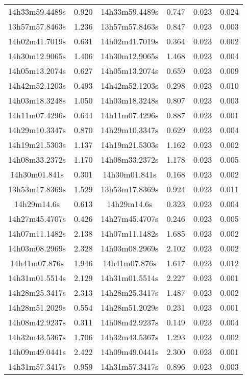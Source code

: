 \begin{table}
\begin{tabular}{cccccc}
14h33m59.4489s & 0.920 & 14h33m59.4489s & 0.747 & 0.023 & 0.024 \\
13h57m57.8463s & 1.236 & 13h57m57.8463s & 0.847 & 0.023 & 0.003 \\
14h02m41.7019s & 0.631 & 14h02m41.7019s & 0.364 & 0.023 & 0.002 \\
14h30m12.9065s & 1.406 & 14h30m12.9065s & 1.468 & 0.023 & 0.004 \\
14h05m13.2074s & 0.627 & 14h05m13.2074s & 0.659 & 0.023 & 0.009 \\
14h42m52.1203s & 0.493 & 14h42m52.1203s & 0.298 & 0.023 & 0.010 \\
14h03m18.3248s & 1.050 & 14h03m18.3248s & 0.807 & 0.023 & 0.003 \\
14h11m07.4296s & 0.644 & 14h11m07.4296s & 0.887 & 0.023 & 0.001 \\
14h29m10.3347s & 0.870 & 14h29m10.3347s & 0.629 & 0.023 & 0.004 \\
14h19m21.5303s & 1.137 & 14h19m21.5303s & 1.162 & 0.023 & 0.002 \\
14h08m33.2372s & 1.170 & 14h08m33.2372s & 1.178 & 0.023 & 0.005 \\
14h30m01.841s & 0.301 & 14h30m01.841s & 0.168 & 0.023 & 0.002 \\
13h53m17.8369s & 1.529 & 13h53m17.8369s & 0.924 & 0.023 & 0.011 \\
14h29m14.6s & 0.613 & 14h29m14.6s & 0.323 & 0.023 & 0.004 \\
14h27m45.4707s & 0.426 & 14h27m45.4707s & 0.246 & 0.023 & 0.005 \\
14h07m11.1482s & 2.138 & 14h07m11.1482s & 1.685 & 0.023 & 0.002 \\
14h03m08.2969s & 2.328 & 14h03m08.2969s & 2.102 & 0.023 & 0.002 \\
14h41m07.876s & 1.946 & 14h41m07.876s & 1.617 & 0.023 & 0.012 \\
14h31m01.5514s & 2.129 & 14h31m01.5514s & 2.227 & 0.023 & 0.001 \\
14h28m25.3417s & 2.313 & 14h28m25.3417s & 1.487 & 0.023 & 0.002 \\
14h28m51.2029s & 0.554 & 14h28m51.2029s & 0.231 & 0.023 & 0.001 \\
14h08m42.9237s & 0.311 & 14h08m42.9237s & 0.149 & 0.023 & 0.004 \\
14h32m43.5367s & 1.706 & 14h32m43.5367s & 1.293 & 0.023 & 0.002 \\
14h09m49.0441s & 2.422 & 14h09m49.0441s & 2.300 & 0.023 & 0.001 \\
14h31m57.3417s & 0.959 & 14h31m57.3417s & 0.896 & 0.023 & 0.003 \\

\end{tabular}
\end{table}
